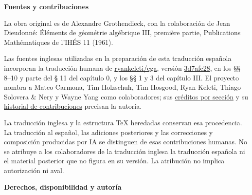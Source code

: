 
\ifdefined\pdfinfoomitdate{}\fi
\ifdefined\pdftrailerid\pdftrailerid{}\fi
\ifdefined\pdfsuppressptexinfo{}\fi
\setlength{\emergencystretch}{6em}

\makeatletter
\let\EGAReaderOriginalHyperref\hyperref
\renewcommand{\hyperref}[2][]{%
  \@ifundefined{r@#1}{#2}{\EGAReaderOriginalHyperref[#1]{#2}}}
\makeatother



\begingroup
\small

\noindent\textbf{Fuentes y contribuciones}

La obra original es de Alexandre Grothendieck, con la colaboración de Jean Dieudonné: Éléments de géométrie algébrique III, première partie, Publications Mathématiques de l’IHÉS 11 (1961).

Las fuentes inglesas utilizadas en la preparación de esta traducción española incorporan la traducción humana de \href{https://github.com/ryankeleti/ega}{ryankeleti/ega}, versión \href{https://github.com/ryankeleti/ega/tree/3d7afe28c99d1887ccdb85acf2ca1afd93fb1971}{3d7afe28}, en los §§ 8–10 y parte del § 11 del capítulo 0, y los §§ 1 y 3 del capítulo III. El proyecto nombra a Mateo Carmona, Tim Holzschuh, Tim Hosgood, Ryan Keleti, Thiago Solovera \& Nery y Wayne Yang como colaboradores; sus \href{https://github.com/ryankeleti/ega/blob/3d7afe28c99d1887ccdb85acf2ca1afd93fb1971/README.md}{créditos por sección} y su \href{https://github.com/ryankeleti/ega/commits/3d7afe28c99d1887ccdb85acf2ca1afd93fb1971}{historial de contribuciones} precisan la autoría.

La traducción inglesa y la estructura TeX heredadas conservan esa procedencia. La traducción al español, las adiciones posteriores y las correcciones y composición producidas por IA se distinguen de esas contribuciones humanas. No se atribuye a los colaboradores de la traducción inglesa la traducción española ni el material posterior que no figura en su versión. La atribución no implica autorización ni aval.

\par\medskip
\noindent\textbf{Derechos, disponibilidad y autoría}

